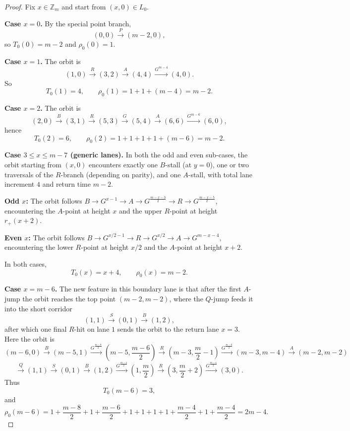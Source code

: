 \documentclass[11pt]{article}
\newcommand{\Zm}{\mathbb Z_m}
\begin{document}
\begin{proof}
Fix $x\in \Zm$ and start from $(x,0)\in L_0$.

\smallskip
\noindent\textbf{Case $x=0$.}
By the special point branch,
\[
(0,0)\xrightarrow{P}(m-2,0),
\]
so $T_0(0)=m-2$ and $\rho_0(0)=1$.

\smallskip
\noindent\textbf{Case $x=1$.}
The orbit is
\[
(1,0)\xrightarrow{R}(3,2)\xrightarrow{A}(4,4)\xrightarrow{G^{m-4}}(4,0).
\]
So
\[
T_0(1)=4,\qquad \rho_0(1)=1+1+(m-4)=m-2.
\]

\smallskip
\noindent\textbf{Case $x=2$.}
The orbit is
\[
(2,0)\xrightarrow{B}(3,1)\xrightarrow{R}(5,3)\xrightarrow{G}(5,4)\xrightarrow{A}(6,6)
\xrightarrow{G^{m-6}}(6,0),
\]
hence
\[
T_0(2)=6,\qquad \rho_0(2)=1+1+1+1+(m-6)=m-2.
\]

\smallskip
\noindent\textbf{Case $3\le x\le m-7$ (generic lanes).}
In both the odd and even sub-cases, the orbit starting from $(x,0)$ encounters exactly one $B$-stall (at $y=0$), one or two traversals of the $R$-branch (depending on parity), and one $A$-stall, with total lane increment $4$ and return time $m-2$.

\smallskip
\noindent\textbf{Odd $x$:}\enspace
The orbit follows $B\to G^{x-1}\to A\to G^{\frac{m-x-3}{2}}\to R\to G^{\frac{m-x-5}{2}}$, encountering the $A$-point at height $x$ and the upper $R$-point at height $r_+(x+2)$.

\smallskip
\noindent\textbf{Even $x$:}\enspace
The orbit follows $B\to G^{x/2-1}\to R\to G^{x/2}\to A\to G^{m-x-4}$, encountering the lower $R$-point at height $x/2$ and the $A$-point at height $x+2$.

\smallskip\noindent
In both cases,
\[
T_0(x)=x+4,\qquad \rho_0(x)=m-2.
\]

\smallskip
\noindent\textbf{Case $x=m-6$.}
The new feature in this boundary lane is that after the first $A$-jump the
orbit reaches the top point $(m-2,m-2)$, where the $Q$-jump feeds it into the
short corridor
\[
(1,1)\xrightarrow{S}(0,1)\xrightarrow{B}(1,2),
\]
after which one final $R$-hit on lane $1$ sends the orbit to the return lane
$x=3$.
Here the orbit is
\[
(m-6,0)\xrightarrow{B}(m-5,1)
\xrightarrow{G^{\frac{m-8}{2}}}\left(m-5,\frac{m-6}{2}\right)\xrightarrow{R}\left(m-3,\frac m2-1\right)
\xrightarrow{G^{\frac{m-6}{2}}}(m-3,m-4)\xrightarrow{A}(m-2,m-2)
\]
\[
\xrightarrow{Q}(1,1)\xrightarrow{S}(0,1)\xrightarrow{B}(1,2)
\xrightarrow{G^{\frac{m-4}{2}}}\left(1,\frac m2\right)\xrightarrow{R}\left(3,\frac m2+2\right)
\xrightarrow{G^{\frac{m-4}{2}}}(3,0).
\]
Thus
\[
T_0(m-6)=3,
\]
and
\[
\rho_0(m-6)=
1+\frac{m-8}{2}+1+\frac{m-6}{2}+1+1+1+1+\frac{m-4}{2}+1+\frac{m-4}{2}
=
2m-4.
\]


\end{proof}
\end{document}
